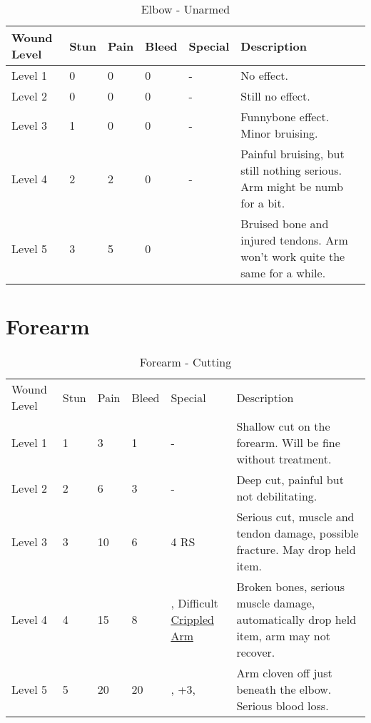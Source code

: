 \documentclass[oneside,11pt,english]{book}
\begin{document}
\begin{table}[!hb] %
	\caption{Elbow - Unarmed}
	\label{wound:Elbow - Unarmed}
	\begin{tabu} to 
Wound Level &Stun &Pain &Bleed &Special &Description\\\toprule
Level 1& 0& 0& 0& - &No effect.\\
Level 2& 0& 0& 0& - &Still no effect.\\
Level 3& 1& 0& 0& - &Funnybone effect. Minor bruising.\\
Level 4& 2& 2& 0& - &Painful bruising, but still nothing serious. Arm might be numb for a bit.\\
Level 5& 3& 5& 0&  &Bruised bone and injured tendons. Arm won’t work quite the same for a while.\\
	\end{tabu}
\end{table}
	\clearpage

\section{Forearm} \vspace{-25pt} \label{sec:forearm}
\begin{table}[!hb] %
	\caption{Forearm - Cutting}
	\label{wound:Forearm - Cutting}
	\begin{tabu} to 
		Wound Level &Stun &Pain &Bleed &Special &Description\\
		Level 1& 1& 3& 1& - &Shallow cut on the forearm. Will be fine without treatment.\\
		Level 2& 2& 6& 3& - &Deep cut, painful but not debilitating.\\
		Level 3& 3& 10& 6&  4 RS &Serious cut, muscle and tendon damage, possible fracture. May drop held item.\\
		Level 4& 4& 15& 8& , \newline
		Difficult  \hyperref[bane:Crippled Limb/Appendage]{Crippled Arm} &Broken bones, serious muscle damage, automatically drop held item, arm may not recover.\\
		Level 5& 5& 20& 20& , \newline
	 +3, \newline
&Arm cloven off just beneath the elbow. Serious blood loss.\\
	\end{tabu}
\end{table}
\end{document}
